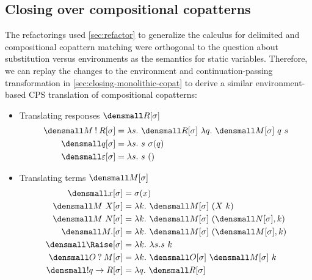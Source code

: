\subsection{Closing over compositional copatterns}
\label{sec:closing-compositional-copat}

The refactorings used \cref{sec:refactor} to generalize the calculus for
delimited and compositional copattern matching were orthogonal to the question
about substitution versus environments as the semantics for static variables.
Therefore, we can replay the changes to the environment and continuation-passing
transformation in \cref{sec:closing-monolithic-copat} to derive a similar
environment-based CPS translation of compositional copatterns:
\begin{itemize}
\item Translating responses $\den{R}[\sigma]$
\begin{align*}
  \den{M \ans R}[\sigma]
  &=
  \lambda s.~ \den{R}[\sigma] ~ \lambda q.~ \den{M}[\sigma] ~ q ~ s
  \\
  \den{q}[\sigma] &= \lambda s.~ s ~ \sigma(q)
  \\
  \den{\varepsilon}[\sigma] &= \lambda s.~ s ~ ()
\end{align*}

\item Translating terms $\den{M}[\sigma]$
  \begin{align*}
  \den{x}[\sigma] &= \sigma(x)
  \\
  \den{M~X}[\sigma] &= \lambda k.~ \den{M}[\sigma]~(X~k)
  \\
  \den{M~N}[\sigma] &= \lambda k.~ \den{M}[\sigma]~(\den{N}[\sigma], k)
  \\
  \den{M.}[\sigma] &= \lambda k.~ \den{M}[\sigma]~(\den{M}[\sigma], k)
  \\
  \den{\Raise}[\sigma] &= \lambda k.~ \lambda s. s ~ k
  \\
  \den{O \ask M}[\sigma] &= \lambda k.~ \den{O}[\sigma] ~ \den{M}[\sigma] ~ k
  \\
  \den{\ans q \to R}[\sigma] &= \lambda q.~ \den{R}[\sigma]
\end{align*}


\end{itemize}
